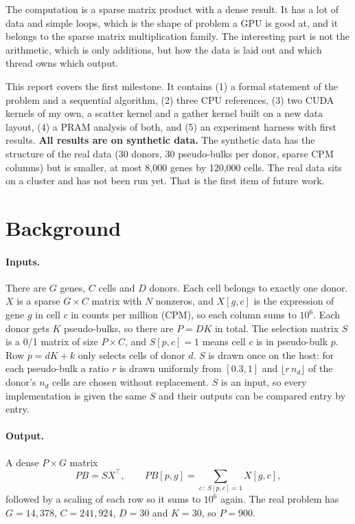 \documentclass[sigconf,nonacm]{acmart}
\begin{document}
The computation is a sparse matrix product with a dense result. It has a lot of data and simple
loops, which is the shape of problem a GPU is good at, and it belongs to the sparse matrix
multiplication family. The interesting part is not the arithmetic, which is only additions, but how
the data is laid out and which thread owns which output.

This report covers the first milestone. It contains (1) a formal statement of the problem and a
sequential algorithm, (2) three CPU references, (3) two CUDA kernels of my own, a scatter kernel and
a gather kernel built on a new data layout, (4) a PRAM analysis of both, and (5) an experiment
harness with first results. \textbf{All results are on synthetic data.} The synthetic data has the
structure of the real data (30 donors, 30 pseudo-bulks per donor, sparse CPM columns) but is smaller,
at most 8,000 genes by 120,000 cells. The real data sits on a cluster and has not been run yet. That
is the first item of future work.

\section{Background}

\paragraph{Inputs.} There are $G$ genes, $C$ cells and $D$ donors. Each cell belongs to exactly one
donor. $X$ is a sparse $G \times C$ matrix with $N$ nonzeros, and $X[g,c]$ is the expression of gene
$g$ in cell $c$ in counts per million (CPM), so each column sums to $10^6$. Each donor gets $K$
pseudo-bulks, so there are $P = DK$ in total. The selection matrix $S$ is a 0/1 matrix of size
$P \times C$, and $S[p,c] = 1$ means cell $c$ is in pseudo-bulk $p$. Row $p = dK + k$ only selects
cells of donor $d$. $S$ is drawn once on the host: for each pseudo-bulk a ratio $r$ is drawn
uniformly from $[0.3, 1]$ and $\lfloor r\,n_d \rfloor$ of the donor's $n_d$ cells are chosen without
replacement. $S$ is an input, so every implementation is given the same $S$ and their outputs can be
compared entry by entry.

\paragraph{Output.} A dense $P \times G$ matrix
\begin{equation}
PB = S X^{\top}, \qquad PB[p,g] = \sum_{c\,:\,S[p,c]=1} X[g,c],
\label{eq:pb}
\end{equation}
followed by a scaling of each row so it sums to $10^6$ again. The real problem has $G = 14{,}378$,
$C = 241{,}924$, $D = 30$ and $K = 30$, so $P = 900$.
\end{document}
